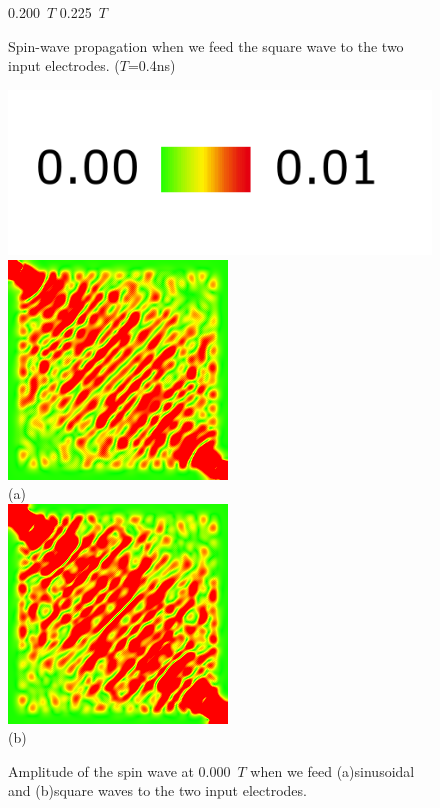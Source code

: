 \documentclass[a4j, twocolumn]{jsarticle}
\begin{document}
\begin{figure}
0.200\ $T$ \hspace*{0.25\hsize} 0.225\ $T$  \vspace{5pt}\\
\caption{
Spin-wave propagation when we feed the square wave to the two input electrodes. ($T$=0.4ns)
}
\label{fig:waves4xsqr}
\end{figure}

\begin{figure}
\centering
\includegraphics[width=0.4\hsize]{./figures/colorbar_002.png} \\
\includegraphics[width=0.5\hsize]{./figures/capture/sin/32i_l_hil_5760} \\
(a)\\
\includegraphics[width=0.5\hsize]{./figures/capture/sqr/32i_l_hil_7060} \\
(b)\\ 
\caption{Amplitude of the spin wave at 0.000~$T$ when we feed (a)sinusoidal and (b)square waves to the two input electrodes.}
\label{fig:hil}
\end{figure}
\end{document}
